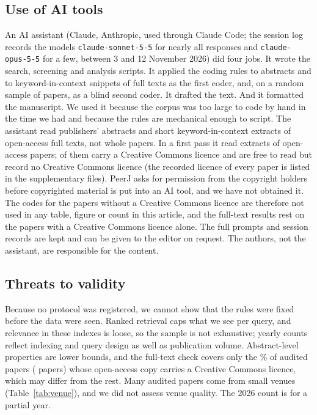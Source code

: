 \documentclass[preprint,12pt]{elsarticle}
\begin{document}
\subsection{Use of AI tools}\label{sec:ai}
An AI assistant (Claude, Anthropic, used through Claude Code; the session log records the models \texttt{claude-sonnet-5-5} for nearly all responses and \texttt{claude-opus-5-5} for a few, between 3 and 12 November 2026) did four jobs. It wrote the search, screening and analysis scripts. It applied the coding rules to abstracts and to keyword-in-context snippets of full texts as the first coder, and, on a random sample of \agNAll{} papers, as a blind second coder. It drafted the text. And it formatted the manuscript. We used it because the corpus was too large to code by hand in the time we had and because the rules are mechanical enough to script. The assistant read publishers' abstracts and short keyword-in-context extracts of open-access full texts, not whole papers. In a first pass it read extracts of \ftAllN{} open-access papers; \ftLicCC{} of them carry a Creative Commons licence and \ftLicNone{} are free to read but record no Creative Commons licence (the recorded licence of every paper is listed in the supplementary files). PeerJ asks for permission from the copyright holders before copyrighted material is put into an AI tool, and we have not obtained it. The codes for the \ftLicNone{} papers without a Creative Commons licence are therefore not used in any table, figure or count in this article, and the full-text results rest on the \ftLicCC{} papers with a Creative Commons licence alone. The full prompts and session records are kept and can be given to the editor on request. The authors, not the assistant, are responsible for the content. \humanThreat{}

\subsection{Threats to validity}
Because no protocol was registered, we cannot show that the rules were fixed before the data were seen. Ranked retrieval caps what we see per query, and relevance in these indexes is loose, so the sample is not exhaustive; yearly counts reflect indexing and query design as well as publication volume. \srcThreat{} Abstract-level properties are lower bounds, and the full-text check covers only the \ftCcPct\% of audited papers (\ftN{} papers) whose open-access copy carries a Creative Commons licence, which may differ from the rest. Many audited papers come from small venues (Table~\ref{tab:venue}), and we did not assess venue quality. \humanThreat{} The 2026 count is for a partial year.
\end{document}
